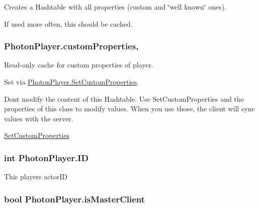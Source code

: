 Creates a Hashtable with all properties (custom and \char`\"{}well known\char`\"{} ones). 

If used more often, this should be cached.
\subsubsection[{\texorpdfstring{custom\+Properties}{customProperties}}]{ Photon\+Player.\+custom\+Properties\hspace{0.3cm}{\ttfamily [get]}, {\ttfamily [set]}}\hypertarget{class_photon_player_ab7e0bc6125b15524e74b5ac9d7c337d7}{}\label{class_photon_player_ab7e0bc6125b15524e74b5ac9d7c337d7}


Read-\/only cache for custom properties of player. 

Set via \hyperlink{class_photon_player_af8815abb8edaafbe6bddbf328f9612fb}{Photon\+Player.\+Set\+Custom\+Properties}.

Don\textquotesingle{}t modify the content of this Hashtable. Use Set\+Custom\+Properties and the properties of this class to modify values. When you use those, the client will sync values with the server. 

\hyperlink{class_photon_player_af8815abb8edaafbe6bddbf328f9612fb}{Set\+Custom\+Properties} 
\subsubsection[{\texorpdfstring{ID}{ID}}]{\setlength{\rightskip}{0pt plus 5cm}int Photon\+Player.\+ID\hspace{0.3cm}{\ttfamily [get]}}\hypertarget{class_photon_player_ac363d86e7c6ea63573e0ecfda7f7eaa7}{}\label{class_photon_player_ac363d86e7c6ea63573e0ecfda7f7eaa7}


This player\textquotesingle{}s actor\+ID

\subsubsection[{\texorpdfstring{is\+Master\+Client}{isMasterClient}}]{\setlength{\rightskip}{0pt plus 5cm}bool Photon\+Player.\+is\+Master\+Client\hspace{0.3cm}{\ttfamily [get]}}\hypertarget{class_photon_player_ade88a2875960de99e5ab98fc6db1650c}{}\label{class_photon_player_ade88a2875960de99e5ab98fc6db1650c}


